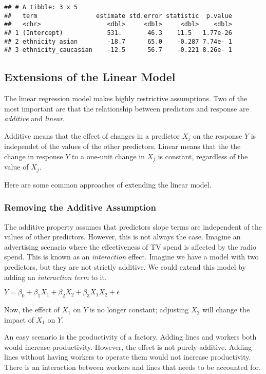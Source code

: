 \documentclass[]{book}
\begin{document}
\begin{verbatim}
## # A tibble: 3 x 5
##   term                estimate std.error statistic  p.value
##   <chr>                  <dbl>     <dbl>     <dbl>    <dbl>
## 1 (Intercept)            531.       46.3    11.5   1.77e-26
## 2 ethnicity_asian        -18.7      65.0    -0.287 7.74e- 1
## 3 ethnicity_caucasian    -12.5      56.7    -0.221 8.26e- 1
\end{verbatim}

\hypertarget{extensions-of-the-linear-model}{%
\subsection{Extensions of the Linear Model}\label{extensions-of-the-linear-model}}

The linear regression model makes highly restrictive assumptions. Two of the most important are that the relationship between predictors and response are \emph{additive} and \emph{linear}.

Additive means that the effect of changes in a predictor \(X_j\) on the response \(Y\) is independet of the values of the other predictors. Linear means that the the change in response \(Y\) to a one-unit change in \(X_j\) is constant, regardless of the value of \(X_j\).

Here are some common approaches of extending the linear model.

\hypertarget{removing-the-additive-assumption}{%
\subsubsection{Removing the Additive Assumption}\label{removing-the-additive-assumption}}

The additive property assumes that predictors slope terms are independent of the values of other predictors. However, this is not always the case. Imagine an advertising scenario where the effectiveness of TV spend is affected by the radio spend. This is known as an \emph{interaction} effect. Imagine we have a model with two predictors, but they are not strictly additive. We could extend this model by adding an \emph{interaction term} to it.

\(Y = \beta_0 + \beta_1X_1 + \beta_2X_2 + \beta_3X_1X_2 + \epsilon\)

Now, the effect of \(X_1\) on \(Y\) is no longer constant; adjusting \(X_2\) will change the impact of \(X_1\) on \(Y\).

An easy scenario is the productivity of a factory. Adding lines and workers both would increase productivity. However, the effect is not purely additive. Adding lines without having workers to operate them would not increase productivity. There is an interaction between workers and lines that needs to be accounted for.
\end{document}

